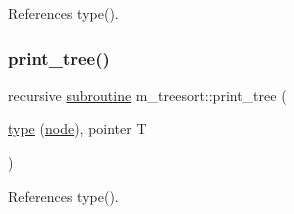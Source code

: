 References type().

\mbox{\label{namespacem__treesort_adbff3cab09e78694a914782b533e2732}} 
\subsubsection{\texorpdfstring{print\+\_\+tree()}{print\_tree()}}
{\footnotesize\ttfamily recursive \hyperlink{M__stopwatch_83_8txt_acfbcff50169d691ff02d4a123ed70482}{subroutine} m\+\_\+treesort\+::print\+\_\+tree (\begin{DoxyParamCaption}\item[{\hyperlink{stop__watch_83_8txt_a70f0ead91c32e25323c03265aa302c1c}{type} (\hyperlink{structm__treesort_1_1node}{node}), pointer}]{T }\end{DoxyParamCaption})}



References type().

